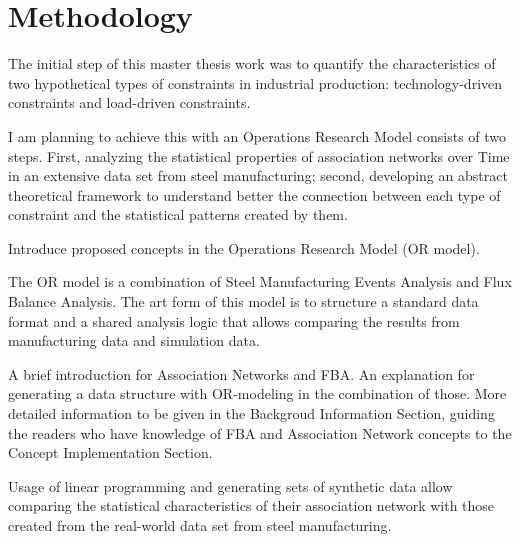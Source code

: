 \chapter{Methodology}
{\color{red} 
	
	The initial step of this master thesis work was to quantify the characteristics of two hypothetical types of constraints in industrial production: technology-driven constraints and load-driven constraints. 
	
	I am planning to achieve this with an Operations Research Model consists of two steps. First, analyzing the statistical properties of association networks over Time in an extensive data set from steel manufacturing; second, developing an abstract theoretical framework to understand better the connection between each type of constraint and the statistical patterns created by them. 
	
}

{\color{red} 
	
	Introduce proposed concepts in the Operations Research Model (OR model).
	
	The OR model is a combination of Steel Manufacturing Events Analysis and Flux Balance Analysis. The art form of this model is to structure a standard data format and a shared analysis logic that allows comparing the results from manufacturing data and simulation data.
	
	A brief introduction for Association Networks and FBA. 
	An explanation for generating a data structure with OR-modeling in the combination of those. More detailed information to be given in the Backgroud Information Section, guiding the readers who have knowledge of FBA and Association Network concepts to the Concept Implementation Section.
	
	Usage of linear programming and generating sets of synthetic data allow comparing the statistical characteristics of their association network with those created from the real-world data set from steel manufacturing.
	
}



